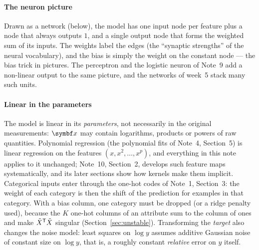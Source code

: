 \documentclass[11pt]{article}
\newcommand{\Xt}{\tilde X}
\newcommand{\w}{\vect{w}}
\begin{document}
\paragraph{The neuron picture} Drawn as a network (below), the model has one input node per feature plus a node that
always outputs $1$, and a single output node that forms the weighted sum of its inputs. The weights label the edges
(the ``synaptic strengths'' of the neural vocabulary), and the bias is simply the weight on the constant node --- the
bias trick in pictures. The perceptron and the logistic neuron of Note~9 add a non-linear output to the same picture,
and the networks of week~5 stack many such units.
\begin{center}
\end{center}

\paragraph{Linear in the parameters} The model is linear in its \emph{parameters}, not necessarily in the original
measurements: $\x$ may contain logarithms, products or powers of raw quantities. Polynomial regression (the polynomial
fits of Note~4, Section~5) is linear regression on the features $(x, x^2, \dots, x^p)$, and everything in this note
applies to it unchanged; Note~10, Section~2, develops such feature maps systematically, and its later sections show how
kernels make them implicit. Categorical inputs enter through the one-hot codes of Note~1, Section~3: the weight of
each category is then the shift of the prediction for examples in that category. With a bias column, one category must
be dropped (or a ridge penalty used), because the $K$ one-hot columns of an attribute sum to the column of ones and
make $\Xt\T\Xt$ singular (Section~\ref{sec:unstable}). Transforming the \emph{target} also changes the noise model: least
squares on $\log y$ assumes additive Gaussian noise of constant size on $\log y$, that is, a roughly constant
\emph{relative} error on $y$ itself.
\end{document}

